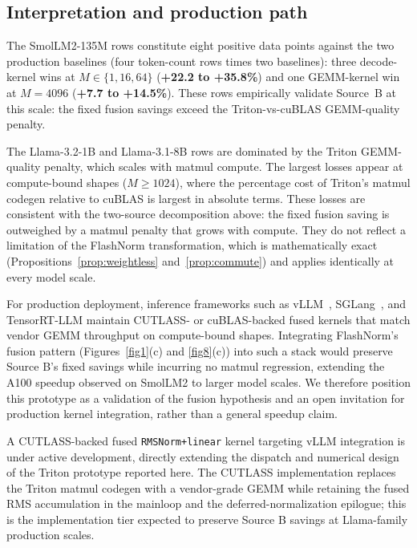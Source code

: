 \documentclass{article}
\begin{document}
\subsection{Interpretation and production path}

The SmolLM2-135M rows constitute eight positive data points against the two production baselines (four token-count rows times two baselines): three decode-kernel wins at $M \in \{1, 16, 64\}$ (\textbf{+22.2 to +35.8\%}) and one GEMM-kernel win at $M{=}4096$ (\textbf{+7.7 to +14.5\%}). These rows empirically validate Source~B at this scale: the fixed fusion savings exceed the Triton-vs-cuBLAS GEMM-quality penalty.

The Llama-3.2-1B and Llama-3.1-8B rows are dominated by the Triton GEMM-quality penalty, which scales with matmul compute. The largest losses appear at compute-bound shapes ($M \geq 1024$), where the percentage cost of Triton's matmul codegen relative to cuBLAS is largest in absolute terms. These losses are consistent with the two-source decomposition above: the fixed fusion saving is outweighed by a matmul penalty that grows with compute. They do not reflect a limitation of the FlashNorm transformation, which is mathematically exact (Propositions~\ref{prop:weightless} and~\ref{prop:commute}) and applies identically at every model scale.

For production deployment, inference frameworks such as vLLM~\citep{vLLM}, SGLang~\citep{sglang}, and TensorRT-LLM maintain CUTLASS- or cuBLAS-backed fused kernels that match vendor GEMM throughput on compute-bound shapes. Integrating FlashNorm's fusion pattern (Figures~\ref{fig1}(c) and \ref{fig8}(c)) into such a stack would preserve Source B's fixed savings while incurring no matmul regression, extending the A100 speedup observed on SmolLM2 to larger model scales. We therefore position this prototype as a validation of the fusion hypothesis and an open invitation for production kernel integration, rather than a general speedup claim.

A CUTLASS-backed fused \texttt{RMSNorm+linear} kernel targeting vLLM integration is under active development, directly extending the dispatch and numerical design of the Triton prototype reported here. The CUTLASS implementation replaces the Triton matmul codegen with a vendor-grade GEMM while retaining the fused RMS accumulation in the mainloop and the deferred-normalization epilogue; this is the implementation tier expected to preserve Source B savings at Llama-family production scales.
\end{document}
